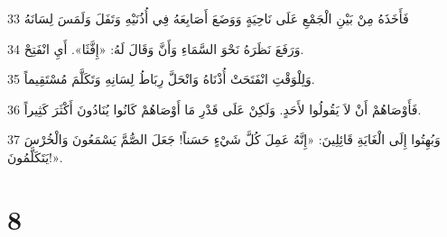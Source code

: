 \par 33 فَأَخَذَهُ مِنْ بَيْنِ الْجَمْعِ عَلَى نَاحِيَةٍ وَوَضَعَ أَصَابِعَهُ فِي أُذُنَيْهِ وَتَفَلَ وَلَمَسَ لِسَانَهُ
\par 34 وَرَفَعَ نَظَرَهُ نَحْوَ السَّمَاءِ وَأَنَّ وَقَالَ لَهُ: «إِفَّثَا». أَيِ انْفَتِحْ.
\par 35 وَلِلْوَقْتِ انْفَتَحَتْ أُذْنَاهُ وَانْحَلَّ رِبَاطُ لِسَانِهِ وَتَكَلَّمَ مُسْتَقِيماً.
\par 36 فَأَوْصَاهُمْ أَنْ لاَ يَقُولُوا لأَحَدٍ. وَلَكِنْ عَلَى قَدْرِ مَا أَوْصَاهُمْ كَانُوا يُنَادُونَ أَكْثَرَ كَثِيراً.
\par 37 وَبُهِتُوا إِلَى الْغَايَةِ قَائِلِينَ: «إِنَّهُ عَمِلَ كُلَّ شَيْءٍ حَسَناً! جَعَلَ الصُّمَّ يَسْمَعُونَ وَالْخُرْسَ يَتَكَلَّمُونَ!».

\chapter{8}

